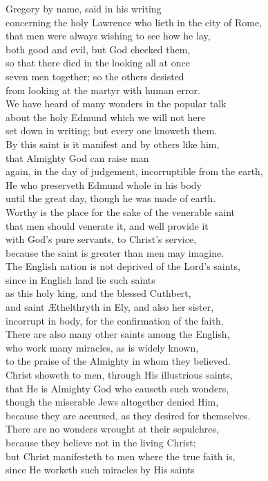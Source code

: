 \documentclass[10pt]{book}
\begin{document}
\begin{center}
\parbox{\pagelen}{
Gregory by name, said in his writing \\
concerning the holy Lawrence who lieth in the city of Rome, \\
that men were always wishing to see how he lay, \\
both good and evil, but God checked them, \\
so that there died in the looking all at once \\
seven men together; so the others desisted \\
from looking at the martyr with human error. \\
We have heard of many wonders in the popular talk \\
about the holy Edmund which we will not here \\
set down in writing; but every one knoweth them. \\
By this saint is it manifest and by others like him, \\
that Almighty God can raise man \\
again, in the day of judgement, incorruptible from the earth, \\
He who preserveth Edmund whole in his body \\
until the great day, though he was made of earth. \\
Worthy is the place for the sake of the venerable saint \\
that men should venerate it, and well provide it \\
with God's pure servants, to Christ's service, \\
because the saint is greater than men may imagine. \\
The English nation is not deprived of the Lord's saints, \\
since in English land lie such saints \\
as this holy king, and the blessed Cuthbert, \\
and saint \AE{}thelthryth in Ely, and also her sister, \\
incorrupt in body, for the confirmation of the faith. \\
There are also many other saints among the English, \\
who work many miracles, as is widely known, \\
to the praise of the Almighty in whom they believed. \\
Christ showeth to men, through His illustrious saints, \\
that He is Almighty God who causeth such wonders, \\
though the miserable Jews altogether denied Him, \\
because they are accursed, as they desired for themselves. \\
There are no wonders wrought at their sepulchres, \\
because they believe not in the living Christ; \\
but Christ manifesteth to men where the true faith is, \\
since He worketh such miracles by His saints \\
}
\end{center}
\end{document}
